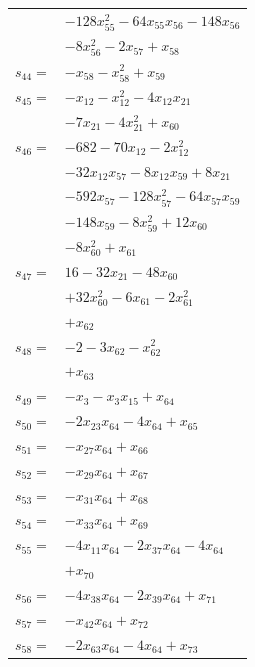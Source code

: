 \begin{longtable}{@{}r@{\;}l@{}}
 & \(\displaystyle -128x_{55}^{2} -64x_{55}x_{56} -148x_{56}\) \\
 & \(\displaystyle -8x_{56}^{2} -2x_{57} +x_{58}\) \\[3pt]
\(s_{44}=\) & \(\displaystyle -x_{58} -x_{58}^{2} +x_{59}\) \\[3pt]
\(s_{45}=\) & \(\displaystyle -x_{12} -x_{12}^{2} -4x_{12}x_{21}\) \\
 & \(\displaystyle -7x_{21} -4x_{21}^{2} +x_{60}\) \\[3pt]
\(s_{46}=\) & \(\displaystyle -682 -70x_{12} -2x_{12}^{2}\) \\
 & \(\displaystyle -32x_{12}x_{57} -8x_{12}x_{59} +8x_{21}\) \\
 & \(\displaystyle -592x_{57} -128x_{57}^{2} -64x_{57}x_{59}\) \\
 & \(\displaystyle -148x_{59} -8x_{59}^{2} +12x_{60}\) \\
 & \(\displaystyle -8x_{60}^{2} +x_{61}\) \\[3pt]
\(s_{47}=\) & \(\displaystyle 16 -32x_{21} -48x_{60}\) \\
 & \(\displaystyle +32x_{60}^{2} -6x_{61} -2x_{61}^{2}\) \\
 & \(\displaystyle +x_{62}\) \\[3pt]
\(s_{48}=\) & \(\displaystyle -2 -3x_{62} -x_{62}^{2}\) \\
 & \(\displaystyle +x_{63}\) \\[3pt]
\(s_{49}=\) & \(\displaystyle -x_{3} -x_{3}x_{15} +x_{64}\) \\[3pt]
\(s_{50}=\) & \(\displaystyle -2x_{23}x_{64} -4x_{64} +x_{65}\) \\[3pt]
\(s_{51}=\) & \(\displaystyle -x_{27}x_{64} +x_{66}\) \\[3pt]
\(s_{52}=\) & \(\displaystyle -x_{29}x_{64} +x_{67}\) \\[3pt]
\(s_{53}=\) & \(\displaystyle -x_{31}x_{64} +x_{68}\) \\[3pt]
\(s_{54}=\) & \(\displaystyle -x_{33}x_{64} +x_{69}\) \\[3pt]
\(s_{55}=\) & \(\displaystyle -4x_{11}x_{64} -2x_{37}x_{64} -4x_{64}\) \\
 & \(\displaystyle +x_{70}\) \\[3pt]
\(s_{56}=\) & \(\displaystyle -4x_{38}x_{64} -2x_{39}x_{64} +x_{71}\) \\[3pt]
\(s_{57}=\) & \(\displaystyle -x_{42}x_{64} +x_{72}\) \\[3pt]
\(s_{58}=\) & \(\displaystyle -2x_{63}x_{64} -4x_{64} +x_{73}\) \\[3pt]

\end{longtable}
